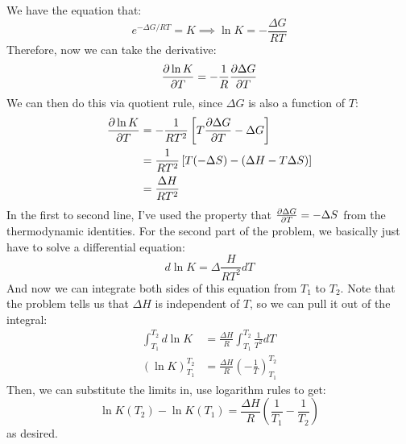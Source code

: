 \documentclass[10pt]{article}
\begin{document}
	\begin{solution}
		We have the equation that:
		\[
		e^{-\Delta G / RT} = K \implies \ln K = -\frac{\Delta G}{RT}
		\] 
		Therefore, now we can take the derivative:
		\[
			\pdv{\ln K}{T} = -\frac{1}{R} \pdv{\Delta G}{T}
		\] 
		We can then do this via quotient rule, since \( \Delta G \) is also a function of \( T \):
		\begin{align*}
			\pdv{\ln K}{T} &= -\frac{1}{RT^2}\left[ T\pdv{\Delta G}{T} - \Delta G \right] \\
			&= \frac{1}{RT^2}\left[ T(-\Delta S) - (\Delta H - T \Delta S) \right]  \\
			&= \frac{\Delta H}{RT^2} 
		\end{align*}
		In the first to second line, I've used the property that \( \pdv{\Delta G}{T} = -\Delta S \) from 
		the thermodynamic identities. For the second part of the problem, we basically just 
		have to solve a differential equation:
		\[
			d \ln K = \Delta \frac{H}{RT^2} dT
		\] 
		And now we can integrate both sides of this equation from \( T_1 \) to \( T_2 \). Note that 
		the problem tells us that \( \Delta H \) is independent of \( T \), so we can 
		pull it out of the integral:
		\begin{align*}
			\int_{T_1}^{T_2} d \ln K &= \frac{\Delta H}{R} \int_{T_1}^{T_2} \frac{1}{T^2} dT\\
			\left( \ln K \right)_{T_1}^{T_2} &= \frac{\Delta H}{R}\left(-\frac{1}{T}\right)_{T_1}^{T_2}
		\end{align*}
		Then, we can substitute the limits in, use logarithm rules to get:
		\[
		\ln K(T_2) - \ln K(T_1) = \frac{\Delta H}{R}\left( \frac{1}{T_1} - \frac{1}{T_2} \right) 
		\] 
		as desired.
	\end{solution}
\end{document}

